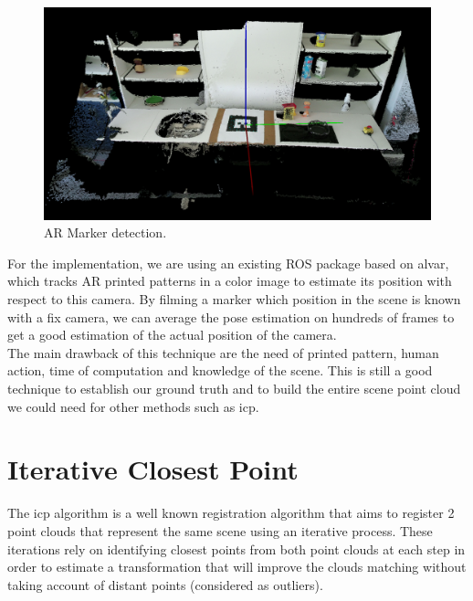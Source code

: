 \begin{figure}[t!]
    \centering
    \includegraphics[width=\textwidth]{images/marker_detection.png}
    \caption{AR Marker detection.}
    \label{fig:ar_marker_kitchen}
\end{figure}

For the implementation, we are using an existing ROS package based on alvar, which tracks AR printed patterns in a color image to estimate its position with respect to this camera. By filming a marker which position in the scene is known with a fix camera, we can average the pose estimation on hundreds of frames to get a good estimation of the actual position of the camera. \\
The main drawback of this technique are the need of printed pattern, human action, time of computation and knowledge of the scene. This is still a good technique to establish our ground truth and to build the entire scene point cloud we could need for other methods such as \acrshort{icp}.

\section{Iterative Closest Point}

The \acrfull{icp} algorithm is a well known registration algorithm that aims to register 2 point clouds that represent the same scene using an iterative process. These iterations rely on identifying closest points from both point clouds at each step in order to estimate a transformation that will improve the clouds matching without taking account of distant points (considered as outliers).\\

